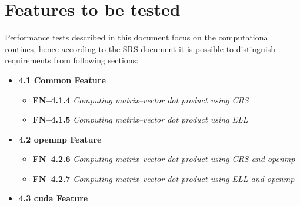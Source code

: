 \section{Features to be tested} \label{s:details-of-the-level-test-design:features-to-be-tested}
	\begin{comment}
		Identify the test items and describe the features and combinations of features that are the object of this
		LTD. Other features that may be exercised but that are not the specific object of this LTD need not be
		identified (e.g., a database management system that is supporting the reports that are being tested). The
		LTD provides more detailed information than the Level Test Plan. For example, identify an overall test
		architecture of all test scenarios, the individual scenarios, and the detailed test objectives within each
		scenario.
		For each feature or feature combination, a reference to its associated requirements in the item
		requirement and/or design description may be included. This may be documented in a Test
		Traceability Matrix (LTP Section 2.2).
	\end{comment}
	Performance tests described in this document focus on the computational routines, hence according to the \gls{SRS} document it is possible to distinguish requirements from following sections:
	\begin{itemize}
		\item
		{
			\textbf{4.1 Common Feature}
			\begin{itemize}
				\item \textbf{FN--4.1.4} \emph{Computing matrix--vector dot product using \gls{CRS}}
				\item \textbf{FN--4.1.5} \emph{Computing matrix--vector dot product using \gls{ELL}}
			\end{itemize}
		}
		\item
		{
			\textbf{4.2 \gls{openmp} Feature}
			\begin{itemize}
				\item \textbf{FN--4.2.6} \emph{Computing matrix--vector dot product using \gls{CRS} and \gls{openmp}}
				\item \textbf{FN--4.2.7} \emph{Computing matrix--vector dot product using \gls{ELL} and \gls{openmp}}
			\end{itemize}
		}
		\item
		{
			\textbf{4.3 \gls{cuda} Feature}
		}
	\end{itemize}
